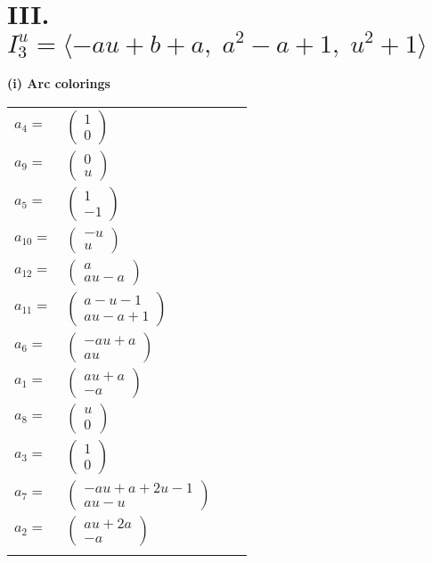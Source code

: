\documentclass[1p]{elsarticle_modified}
\theoremstyle{definition}
\begin{document}
\centering \section*{III. $I^u_{3}= \langle - a u+b+a,\;a^2- a+1,\;u^2+1 \rangle$}
\flushleft \textbf{(i) Arc colorings}\\
\begin{tabular}{m{7pt} m{180pt} m{7pt} m{180pt} }
\flushright $a_{4}=$&$\begin{pmatrix}1\\0\end{pmatrix}$ \\
\flushright $a_{9}=$&$\begin{pmatrix}0\\u\end{pmatrix}$ \\
\flushright $a_{5}=$&$\begin{pmatrix}1\\-1\end{pmatrix}$ \\
\flushright $a_{10}=$&$\begin{pmatrix}- u\\u\end{pmatrix}$ \\
\flushright $a_{12}=$&$\begin{pmatrix}a\\a u- a\end{pmatrix}$ \\
\flushright $a_{11}=$&$\begin{pmatrix}a- u-1\\a u- a+1\end{pmatrix}$ \\
\flushright $a_{6}=$&$\begin{pmatrix}- a u+a\\a u\end{pmatrix}$ \\
\flushright $a_{1}=$&$\begin{pmatrix}a u+a\\- a\end{pmatrix}$ \\
\flushright $a_{8}=$&$\begin{pmatrix}u\\0\end{pmatrix}$ \\
\flushright $a_{3}=$&$\begin{pmatrix}1\\0\end{pmatrix}$ \\
\flushright $a_{7}=$&$\begin{pmatrix}- a u+a+2 u-1\\a u- u\end{pmatrix}$ \\
\flushright $a_{2}=$&$\begin{pmatrix}a u+2 a\\- a\end{pmatrix}$\\&\end{tabular}
\end{document}
